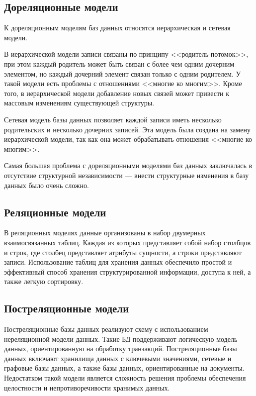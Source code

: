 \subsection{Дореляционные модели}

К дореляционным моделям баз данных относятся иерархическая и сетевая модели. 

В иерархической модели записи связаны по принципу <<родитель-потомок>>, при этом каждый родитель может быть связан с более чем одним дочерним элементом, но каждый дочерний элемент связан только с одним родителем. У такой модели есть проблемы с отношениями <<многие ко многим>>. Кроме того, в иерархической модели добавление новых связей может привести к массовым изменениям существующей структуры.


Сетевая модель базы данных позволяет каждой записи иметь несколько родительских и несколько дочерних записей. Эта модель была создана на замену иерархической модели, так как она может обрабатывать отношения <<многие ко многим>>.

Самая большая проблема с дореляционными моделями баз данных заключалась в отсутствие структурной независимости --- внести структурные изменения в базу данных было очень сложно.

\subsection{Реляционные модели}

В реляционных моделях \cite{db_sql} данные организованы в набор двумерных взаимосвязанных таблиц. Каждая из которых представляет собой набор столбцов и строк, где столбец представляет атрибуты сущности, а строки представляют записи.
Использование таблиц для хранения данных обеспечило простой и эффективный способ хранения структурированной информации, доступа к ней, а также легкую сортировку.


\subsection{Постреляционные модели}

Постреляционные базы данных \cite{db_nosql} реализуют схему с использованием нереляционной модели данных. Такие БД поддерживают логическую модель данных, ориентированную на обработку транзакций. 
Постреляционные базы данных включают хранилища данных с ключевыми значениями, сетевые и графовые базы данных, а также базы данных, ориентированные на документы. 
Недостатком такой модели является сложность решения проблемы обеспечения целостности и непротиворечивости хранимых данных.


